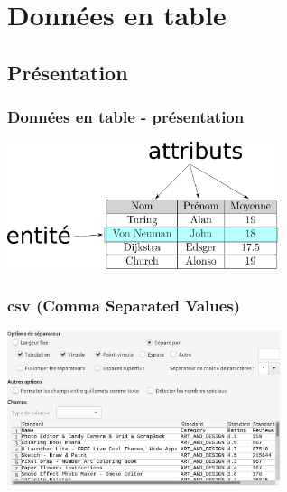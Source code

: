 \documentclass[svgnames,11pt]{beamer}
\begin{document}
\section{Données en table}
\subsection{Présentation}
\begin{frame}
    \frametitle{Données en table - présentation}

    \begin{center}
        \centering
        \includegraphics[width=8cm]{ressources/vocabulaire-legende.png}
        \label{IMG}
    \end{center}

\end{frame}
\begin{frame}
    \frametitle{csv (Comma Separated Values)}

    \begin{center}
        \centering
        \includegraphics[width=8cm]{ressources/jeu-donnees.png}
        \label{IMG}
    \end{center}

\end{frame}
\end{document}
